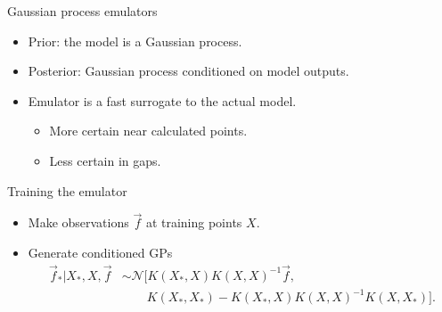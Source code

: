 \documentclass{beamer}
\begin{document}
\begin{frame}{Gaussian process emulators}
  \begin{itemize}
    \item Prior:  the model is a Gaussian process.
    \item Posterior:  Gaussian process conditioned on model outputs.
  \end{itemize}


  \hspace{-5mm}
  

  \begin{itemize}
    \item Emulator is a fast surrogate to the actual model.
      \begin{itemize}
        \item More certain near calculated points.
        \item Less certain in gaps.
      \end{itemize}
  \end{itemize}

\end{frame}


\begin{frame}{Training the emulator}
  \begin{itemize}
    \item Make observations $\vec f$ at training points $X$.
    \item Generate conditioned GPs
        \begin{align*}
          \vec f_* | X_*,X,\vec f &\sim \mathcal N[K(X_*,X)K(X,X)^{-1}\vec f, \\
          &\qquad {} K(X_*,X_*) - K(X_*,X)K(X,X)^{-1}K(X,X_*)].
        \end{align*}
  \end{itemize}

  \centering


\end{frame}
\end{document}
